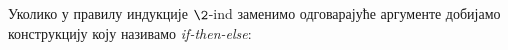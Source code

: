 Уколико у правилу индукције $\2$-ind заменимо одговарајуће аргументе добијамо конструкцију коју називамо \emph{if-then-else}:   
\begin{code}%
\>[0]%
\>[2290I]\AgdaSymbol{:}\AgdaSpace{}%
\AgdaSymbol{\{}\AgdaSpace{}%
\AgdaSymbol{:}\AgdaSpace{}%
\AgdaSpace{}%
\AgdaSpace{}%
\AgdaSpace{}%
\AgdaSpace{}%
\AgdaSymbol{\}}\<%
\\
\>[.][@{}l@{}]\<[2290I]%
\>[13]\AgdaSpace{}%
\AgdaSymbol{(}\AgdaSpace{}%
\AgdaSymbol{:}\AgdaSpace{}%
\AgdaSymbol{)}\<%
\\
%
\>[13]\AgdaSpace{}%
\AgdaSymbol{(}\AgdaSpace{}%
\AgdaSymbol{)}\<%
\\
%
\>[13]\AgdaSpace{}%
\AgdaSymbol{(}\AgdaSpace{}%
\AgdaSymbol{)}\<%
\\
%
\>[13]\AgdaSpace{}%
\AgdaSymbol{(}\AgdaSpace{}%
\AgdaSymbol{)}\<%
\\
\>[0]\AgdaSpace{}%
%
\>[9]\AgdaSpace{}%
\AgdaSpace{}%
\AgdaSpace{}%
\AgdaSpace{}%
\AgdaSymbol{=}\AgdaSpace{}%
\<%
\\
\>[0]\AgdaSpace{}%
\AgdaSpace{}%
\AgdaSpace{}%
\AgdaSpace{}%
\AgdaSpace{}%
\AgdaSpace{}%
\AgdaSymbol{=}\AgdaSpace{}%
\<%
\end{code}